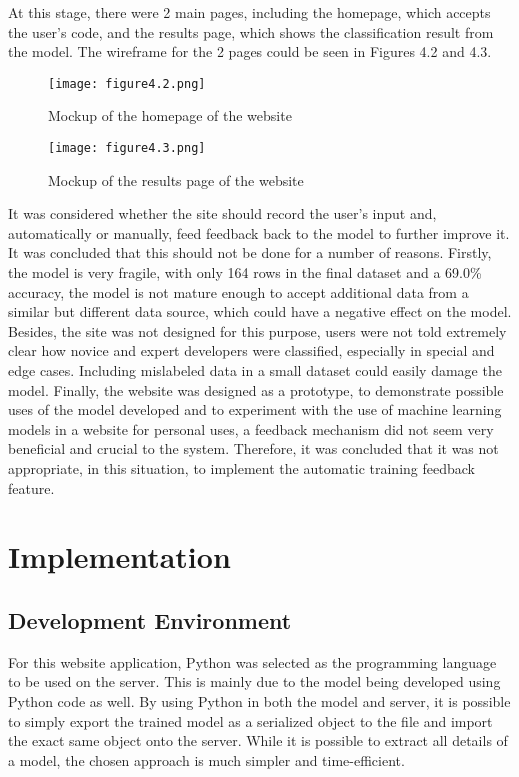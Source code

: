 \documentclass{report}
\begin{document}
At this stage, there were 2 main pages, including the homepage, which accepts the user’s code, and the results page, which shows the classification result from the model. The wireframe for the 2 pages could be seen in Figures 4.2 and 4.3.

\begin{figure}[h!]
\centering
\texttt{[image: figure4.2.png]}
\caption{Mockup of the homepage of the website}
\end{figure}

\begin{figure}[h!]
\centering
\texttt{[image: figure4.3.png]}
\caption{Mockup of the results page of the website}
\end{figure}

It was considered whether the site should record the user’s input and, automatically or manually, feed feedback back to the model to further improve it. It was concluded that this should not be done for a number of reasons. Firstly, the model is very fragile, with only 164 rows in the final dataset and a 69.0\% accuracy, the model is not mature enough to accept additional data from a similar but different data source, which could have a negative effect on the model. Besides, the site was not designed for this purpose, users were not told extremely clear how novice and expert developers were classified, especially in special and edge cases. Including mislabeled data in a small dataset could easily damage the model. Finally, the website was designed as a prototype, to demonstrate possible uses of the model developed and to experiment with the use of machine learning models in a website for personal uses, a feedback mechanism did not seem very beneficial and crucial to the system. Therefore, it was concluded that it was not appropriate, in this situation, to implement the automatic training feedback feature.

\section{Implementation}

\subsection{Development Environment}

For this website application, Python was selected as the programming language to be used on the server. This is mainly due to the model being developed using Python code as well. By using Python in both the model and server, it is possible to simply export the trained model as a serialized object to the file and import the exact same object onto the server. While it is possible to extract all details of a model, the chosen approach is much simpler and time-efficient.
\end{document}
